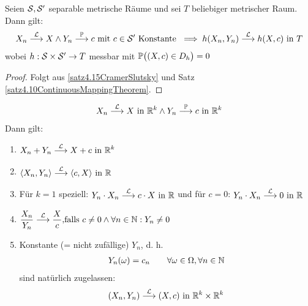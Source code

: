 \begin{korollar}\label{korollar4.17}
	Seien $\S,\S'$ separable metrische Räume und sei $T$ beliebiger metrischer Raum. 
	Dann gilt:
	\begin{align*}
		X_n\stackrel{\L}{\longrightarrow} X\wedge Y_n\stackrel{\P}{\longrightarrow} c\mit c\in\S'\text{ Konstante }
		\implies h(X_n,Y_n)\stackrel{\L}{\longrightarrow} h(X,c)\text{ in }T
	\end{align*}
	wobei $h:\S\times\S'\to T$ messbar mit $\P\big((X,c)\in D_h\big)=0$
\end{korollar}

\begin{proof}
	Folgt aus \ref{satz4.15CramerSlutsky} und Satz \ref{satz4.10ContinuousMappingTheorem}.
\end{proof}

\begin{beispiel}\label{beisp4.18}
	\begin{align*}
		X_n\stackrel{\L}{\longrightarrow} X\text{ in }\R^k\wedge Y_n\stackrel{\P}{\longrightarrow} c\text{ in }\R^k
	\end{align*}
	Dann gilt:
	\begin{enumerate}[label=(\arabic*)]
		\item $\begin{aligned}
			X_n+Y_n\stackrel{\L}{\longrightarrow} X+c\text{ in }\R^k
		\end{aligned}$
		\item $\begin{aligned}
			\langle X_n,Y_n\rangle\stackrel{\L}{\longrightarrow}\langle c,X\rangle\text{ in }\R
		\end{aligned}$
		\item Für $k=1$ speziell:
		$\begin{aligned}
			Y_n\cdot X_n\stackrel{\L}{\longrightarrow}c\cdot X\text{ in }\R
		\end{aligned}$ und für $c=0$:
		$\begin{aligned}
			Y_n\cdot X_n\stackrel{\L}{\longrightarrow}0\text{ in }\R
		\end{aligned}$
		\item $\begin{aligned}
			\frac{X_n}{Y_n}\stackrel{\L}{\longrightarrow} \frac{X}{c},&\falls c\neq0\wedge\forall n\in\N:Y_n\neq0
		\end{aligned}$
		\item Konstante (= nicht zufällige) $Y_n$, d. h.
		\begin{align*}
			Y_n(\omega)=c_n\qquad\forall\omega\in\Omega,\forall n\in\N
		\end{align*}
		sind natürlich zugelassen:
		\begin{align*}
			(X_n,Y_n)\stackrel{\L}{\longrightarrow}(X,c)\text{ in }\R^k\times\R^k
		\end{align*}
	\end{enumerate}
\end{beispiel}

